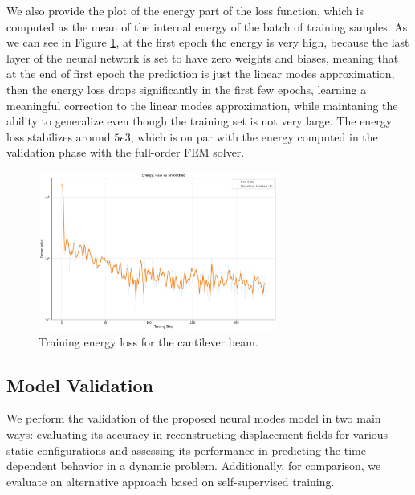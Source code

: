 We also provide the plot of the energy part of the loss function, which is computed as the mean of the internal energy of the batch of training samples. As we can see in Figure \ref{fig:training_energy_loss_beam}, at the first epoch the energy is very high, because the last layer of the neural network is set to have zero weights and biases, meaning that at the end of first epoch the prediction is just the linear modes approximation, then the energy loss drops significantly in the first few epochs, learning a meaningful correction to the linear modes approximation, while maintaning the ability to generalize even though the training set is not very large. The energy loss stabilizes around \(5e3\), which is on par with the energy computed in the validation phase with the full-order FEM solver.

\begin{figure}[H]
    \centering
    \includegraphics[width=0.7\textwidth]{Images/training_energy_smoothed_logy.png}
    \caption{Training energy loss for the cantilever beam.}
    \label{fig:training_energy_loss_beam}
\end{figure}


\subsection{Model Validation}
\label{sec:model_validation}
We perform the validation of the proposed neural modes model in two main ways: evaluating its accuracy in reconstructing displacement fields for various static configurations and assessing its performance in predicting the time-dependent behavior in a dynamic problem. Additionally, for comparison, we evaluate an alternative approach based on self-supervised training.


